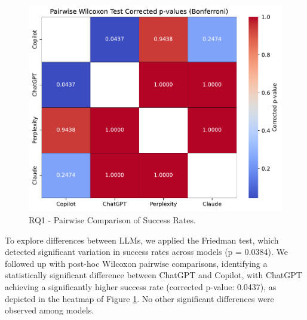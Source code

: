 \documentclass[conference]{IEEEtran}
\begin{document}
\begin{figure}[H]
    \centering
    \includegraphics[width=0.75\linewidth]{figures/results/RQ1-heatmap.pdf}
    \caption{RQ1 - Pairwise Comparison of Success Rates.}
    \label{fig:rq1heatmap}
\end{figure}

To explore differences between LLMs, we applied the Friedman test, which detected significant variation in success rates across models (p = 0.0384). We followed up with post-hoc Wilcoxon pairwise comparisons, identifying a statistically significant difference between ChatGPT and Copilot, with ChatGPT achieving a significantly higher success rate (corrected p-value: 0.0437), as depicted in the heatmap of Figure \ref{fig:rq1heatmap}. No other significant differences were observed among models. 


\end{document}
